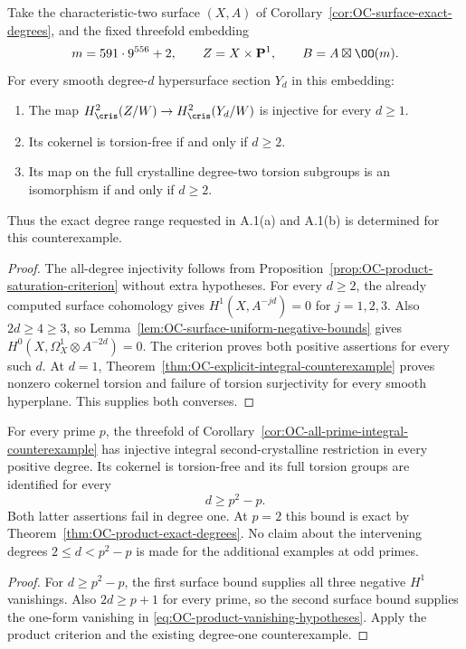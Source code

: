 \begin{theorem}
\label{thm:OC-product-exact-degrees}
Take the characteristic-two surface $(X,A)$ of
Corollary~\ref{cor:OC-surface-exact-degrees}, and the fixed threefold embedding
\[
 m=591\cdot9^{556}+2,\qquad Z=X\times\mathbf P^1,
 \qquad B=A\boxtimes\OO(m).
\]
For every smooth degree-$d$ hypersurface section $Y_d$ in this embedding:
\begin{enumerate}
\item The map $H^2_{\cris}(Z/W)\to H^2_{\cris}(Y_d/W)$ is injective for every $d\geq1$.
\item Its cokernel is torsion-free if and only if $d\geq2$.
\item Its map on the full crystalline degree-two torsion subgroups is an isomorphism if and only if $d\geq2$.
\end{enumerate}
Thus the exact degree range requested in A.1(a) and A.1(b) is determined for this counterexample.
\end{theorem}
\begin{proof}
The all-degree injectivity follows from
Proposition~\ref{prop:OC-product-saturation-criterion} without extra hypotheses.
For every $d\geq2$, the already computed surface cohomology gives
$H^1(X,A^{-jd})=0$ for $j=1,2,3$.
Also $2d\geq4\geq3$, so
Lemma~\ref{lem:OC-surface-uniform-negative-bounds} gives
$H^0(X,\Omega_X^1\otimes A^{-2d})=0$.
The criterion proves both positive assertions for every such $d$.
At $d=1$, Theorem~\ref{thm:OC-explicit-integral-counterexample} proves nonzero cokernel torsion and failure of torsion surjectivity for every smooth hyperplane.  This supplies both converses.
\end{proof}

\begin{corollary}
\label{cor:OC-all-prime-product-degrees}
For every prime $p$, the threefold of
Corollary~\ref{cor:OC-all-prime-integral-counterexample} has injective integral second-crystalline restriction in every positive degree.  Its cokernel is torsion-free and its full torsion groups are identified for every
\[
                              d\geq p^2-p.
\]
Both latter assertions fail in degree one.  At $p=2$ this bound is exact by
Theorem~\ref{thm:OC-product-exact-degrees}.  No claim about the intervening degrees $2\leq d<p^2-p$ is made for the additional examples at odd primes.
\end{corollary}
\begin{proof}
For $d\geq p^2-p$, the first surface bound supplies all three negative $H^1$ vanishings.  Also $2d\geq p+1$ for every prime, so the second surface bound supplies the one-form vanishing in
\eqref{eq:OC-product-vanishing-hypotheses}.  Apply the product criterion and the existing degree-one counterexample.
\end{proof}


